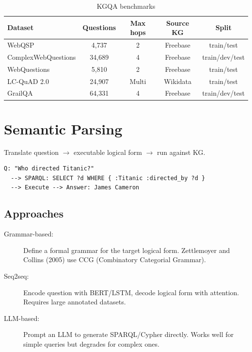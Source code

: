\documentclass[11pt,a4paper,oneside,openany]{book}
\theoremstyle{definition}
\theoremstyle{plain}
\theoremstyle{remark}
\begin{document}
\begin{table}[h]
	\centering
	\caption{KGQA benchmarks}
	\label{tab:kgqa-bench}
	\begin{tabular}{lcccc}
		\toprule
		Dataset             & Questions & Max hops & Source KG & Split          \\
		\midrule
		WebQSP              & 4,737     & 2        & Freebase  & train/test     \\
		ComplexWebQuestions & 34,689    & 4        & Freebase  & train/dev/test \\
		WebQuestions        & 5,810     & 2        & Freebase  & train/test     \\
		LC-QuAD 2.0         & 24,907    & Multi    & Wikidata  & train/test     \\
		GrailQA             & 64,331    & 4        & Freebase  & train/dev/test \\
		\bottomrule
	\end{tabular}
\end{table}

\section{Semantic Parsing}\label{sec:semparse}

Translate question $\to$ executable logical form $\to$ run against KG.

\begin{verbatim}
Q: "Who directed Titanic?"
  --> SPARQL: SELECT ?d WHERE { :Titanic :directed_by ?d }
  --> Execute --> Answer: James Cameron
\end{verbatim}

\subsection{Approaches}

\begin{description}
	\item[Grammar-based:] Define a formal grammar for the target logical form. Zettlemoyer and Collins (2005) use CCG (Combinatory Categorial Grammar).
	\item[Seq2seq:] Encode question with BERT/LSTM, decode logical form with attention. Requires large annotated datasets.
	\item[LLM-based:] Prompt an LLM to generate SPARQL/Cypher directly. Works well for simple queries but degrades for complex ones.
\end{description}
\end{document}
